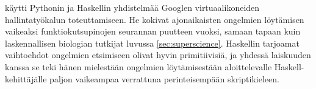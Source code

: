 \citet{pop2010experience} käytti Pythonin ja Haskellin yhdistelmää Googlen virtuaalikoneiden hallintatyökalun toteuttamiseen. He kokivat ajonaikaisten ongelmien löytämisen vaikeaksi funktiokutsupinojen seurannan puutteen vuoksi, samaan tapaan kuin laskennallisen biologian tutkijat luvussa \ref{sec:superscience}. Haskellin tarjoamat vaihtoehdot ongelmien etsimiseen olivat hyvin primitiivisiä, ja yhdessä laiskuuden kanssa se teki hänen mielestään ongelmien löytämisestään aloittelevalle Haskell-kehittäjälle paljon vaikeampaa verrattuna perinteisempään skriptikieleen.


